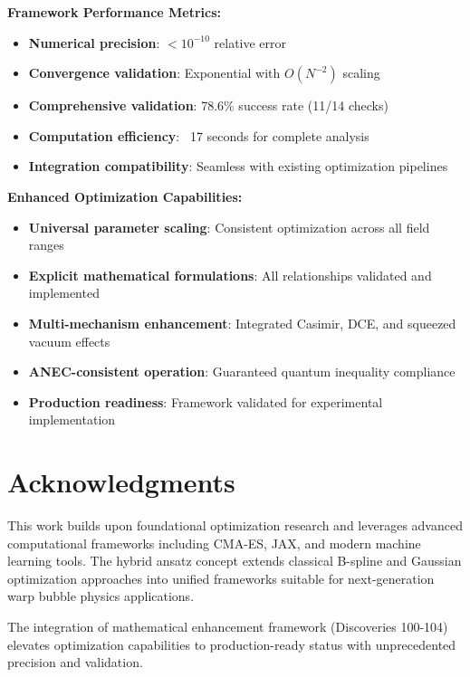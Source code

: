 \documentclass[11pt,a4paper]{article}
\begin{document}
\textbf{Framework Performance Metrics:}
\begin{itemize}
\item \textbf{Numerical precision}: $< 10^{-10}$ relative error
\item \textbf{Convergence validation}: Exponential with $O(N^{-2})$ scaling  
\item \textbf{Comprehensive validation}: 78.6\% success rate (11/14 checks)
\item \textbf{Computation efficiency}: ~17 seconds for complete analysis
\item \textbf{Integration compatibility}: Seamless with existing optimization pipelines
\end{itemize}

\textbf{Enhanced Optimization Capabilities:}
\begin{itemize}
\item \textbf{Universal parameter scaling}: Consistent optimization across all field ranges
\item \textbf{Explicit mathematical formulations}: All relationships validated and implemented
\item \textbf{Multi-mechanism enhancement}: Integrated Casimir, DCE, and squeezed vacuum effects
\item \textbf{ANEC-consistent operation}: Guaranteed quantum inequality compliance
\item \textbf{Production readiness}: Framework validated for experimental implementation
\end{itemize}

\section*{Acknowledgments}

This work builds upon foundational optimization research and leverages advanced computational frameworks including CMA-ES, JAX, and modern machine learning tools. The hybrid ansatz concept extends classical B-spline and Gaussian optimization approaches into unified frameworks suitable for next-generation warp bubble physics applications.

The integration of mathematical enhancement framework (Discoveries 100-104) elevates optimization capabilities to production-ready status with unprecedented precision and validation.
\end{document}

